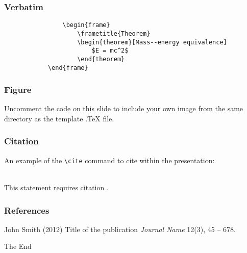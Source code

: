 \documentclass{beamer}
\begin{document}
	
	\begin{frame}[fragile] %
		\frametitle{Verbatim}
		\begin{example}
			\begin{verbatim}
				\begin{frame}
					\frametitle{Theorem}
					\begin{theorem}[Mass--energy equivalence]
						$E = mc^2$
					\end{theorem}
			\end{frame}\end{verbatim}
		\end{example}
	\end{frame}
	
	
	\begin{frame}
		\frametitle{Figure}
		Uncomment the code on this slide to include your own image from the same directory as the template .TeX file.
	\end{frame}
	
	
	\begin{frame}[fragile] %
		\frametitle{Citation}
		An example of the \verb|\cite| command to cite within the presentation:\\~
		
		This statement requires citation \cite{p1}.
	\end{frame}
	
	
	\begin{frame}
		\frametitle{References}
		\footnotesize{
			\begin{thebibliography}{99} %
				 John Smith (2012)
				\newblock Title of the publication
				\newblock \emph{Journal Name} 12(3), 45 -- 678.
			\end{thebibliography}
		}
	\end{frame}
	
	
	\begin{frame}
		\Huge{\centerline{The End}}
	\end{frame}
	
	
\end{document}
